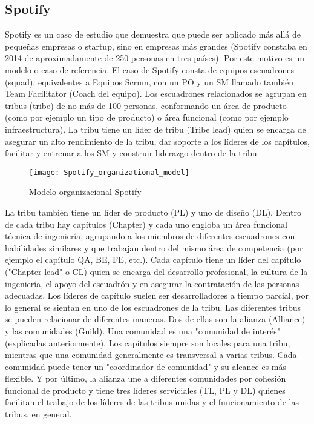 \subsection{Spotify}

Spotify es un caso de estudio que demuestra que puede ser aplicado más allá de pequeñas empresas o startup, sino en empresas más grandes (Spotify constaba en 2014 de aproximadamente de 250 personas en tres países). Por este motivo es un modelo o caso de referencia. El caso de Spotify consta de equipos escuadrones (squad), equivalentes a Equipos Scrum, con un PO y un SM llamado también Team Facilitator (Coach del equipo). Los escuadrones relacionados se agrupan en tribus (tribe) de no más de 100 personas, conformando un área de producto (como por ejemplo un tipo de producto) o área funcional (como por ejemplo infraestructura). La tribu tiene un líder de tribu (Tribe lead) quien se encarga de asegurar un alto rendimiento de la tribu, dar soporte a los líderes de los capítulos, facilitar y entrenar a los SM y construir liderazgo dentro de la tribu. 

\begin{figure}[h]
  \centering
  \texttt{[image: Spotify\_organizational\_model]}
  \caption{Modelo organizacional Spotify}
  \centering
  \label{fig:Spotify_organizational_model} %
\end{figure}

La tribu también tiene un líder de producto (PL) y uno de diseño (DL). Dentro de cada tribu hay capítulos (Chapter) y cada uno engloba un área funcional técnica de ingeniería, agrupando a los miembros de diferentes escuadrones con habilidades similares y que trabajan dentro del mismo área de competencia (por ejemplo el capítulo QA, BE, FE, etc.). Cada capítulo tiene un líder del capítulo ("Chapter lead" o CL) quien se encarga del desarrollo profesional, la cultura de la ingeniería, el apoyo del escuadrón y en asegurar la contratación de las personas adecuadas. Los líderes de capítulo suelen ser desarrolladores a tiempo parcial, por lo general se sientan en uno de los escuadrones de la tribu. 
Las diferentes tribus se pueden relacionar de diferentes maneras. Dos de ellas son la alianza (Alliance) y las comunidades (Guild). Una comunidad es una "comunidad de interés" (explicadas anteriormente). Los capítulos siempre son locales para una tribu, mientras que una comunidad generalmente es transversal a varias tribus. Cada comunidad puede tener un "coordinador de comunidad" y su alcance es más flexible. Y por último, la alianza une a diferentes comunidades por cohesión funcional de producto y tiene tres líderes serviciales (TL, PL y DL) quienes facilitan el trabajo de los líderes de las tribus unidas y el funcionamiento de las tribus, en general.

